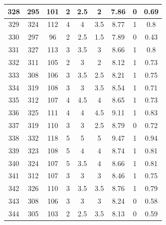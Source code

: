 \documentclass[11pt]{article}
\begin{document}
\begin{appendix}
\begin{longtable}[H]{|c|c|c|c|c|c|c|c|c|}
	328        & 295       & 101         & 2                 & 2.5 & 2   & 7.86 & 0        & 0.69            \\ \hline
	329        & 324       & 112         & 4                 & 4   & 3.5 & 8.77 & 1        & 0.8             \\ \hline
	330        & 297       & 96          & 2                 & 2.5 & 1.5 & 7.89 & 0        & 0.43            \\ \hline
	331        & 327       & 113         & 3                 & 3.5 & 3   & 8.66 & 1        & 0.8             \\ \hline
	332        & 311       & 105         & 2                 & 3   & 2   & 8.12 & 1        & 0.73            \\ \hline
	333        & 308       & 106         & 3                 & 3.5 & 2.5 & 8.21 & 1        & 0.75            \\ \hline
	334        & 319       & 108         & 3                 & 3   & 3.5 & 8.54 & 1        & 0.71            \\ \hline
	335        & 312       & 107         & 4                 & 4.5 & 4   & 8.65 & 1        & 0.73            \\ \hline
	336        & 325       & 111         & 4                 & 4   & 4.5 & 9.11 & 1        & 0.83            \\ \hline
	337        & 319       & 110         & 3                 & 3   & 2.5 & 8.79 & 0        & 0.72            \\ \hline
	338        & 332       & 118         & 5                 & 5   & 5   & 9.47 & 1        & 0.94            \\ \hline
	339        & 323       & 108         & 5                 & 4   & 4   & 8.74 & 1        & 0.81            \\ \hline
	340        & 324       & 107         & 5                 & 3.5 & 4   & 8.66 & 1        & 0.81            \\ \hline
	341        & 312       & 107         & 3                 & 3   & 3   & 8.46 & 1        & 0.75            \\ \hline
	342        & 326       & 110         & 3                 & 3.5 & 3.5 & 8.76 & 1        & 0.79            \\ \hline
	343        & 308       & 106         & 3                 & 3   & 3   & 8.24 & 0        & 0.58            \\ \hline
	344        & 305       & 103         & 2                 & 2.5 & 3.5 & 8.13 & 0        & 0.59            \\ \hline

\end{longtable}
\end{appendix}
\end{document}
